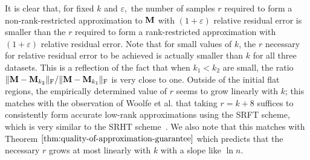 It is clear that, for fixed $k$ and $\varepsilon,$ the number of samples $r$ required to form a non-rank-restricted approximation to ${\bm{\mathrm{M}}}$ with $(1+\varepsilon)$ relative residual error is smaller than the $r$ required to form a rank-restricted approximation with $(1+\varepsilon)$ relative residual error. Note that for small values of $k$, the $r$ necessary for relative residual error to be achieved is actually smaller than $k$ for all three datasets. This is a reflection of the fact that when $k_1 < k_2$ are small, the ratio $\mbox{}\|{\bm{\mathrm{M}}} - {\bm{\mathrm{M}}}_{k_2}\|_\mathrm{F}/\mbox{}\|{\bm{\mathrm{M}}} - {\bm{\mathrm{M}}}_{k_1}\|_\mathrm{F}$ is very close to one. Outside of the initial flat regions, the empirically determined value of $r$ seems to grow linearly with $k$;
this matches with the observation of Woolfe et al. that taking $r=k+8$ suffices to consistently form accurate low-rank approximations using the SRFT scheme, which is very similar to the SRHT scheme~\cite{WLRT07}. We also note that this matches with Theorem $\ref{thm:quality-of-approximation-guarantee}$ which predicts that the necessary $r$ grows at most linearly with $k$ with a slope like $\ln n.$

